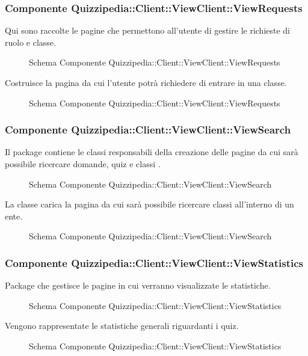 \subsubsection{Componente Quizzipedia::Client::ViewClient::ViewRequests}
Qui sono raccolte le pagine che permettono all'utente di gestire le richieste di ruolo e classe.
\begin{figure}[H]
\centering
\noindent{}
\caption{Schema Componente Quizzipedia::Client::ViewClient::ViewRequests}
\end{figure}
Costruisce la pagina da cui l'utente potrà richiedere di entrare in una classe.
\begin{figure}[H]
\centering
\noindent{}
\caption{Schema Componente Quizzipedia::Client::ViewClient::ViewRequests}
\end{figure}
\subsubsection{Componente Quizzipedia::Client::ViewClient::ViewSearch}
Il package contiene le classi responsabili della creazione delle pagine da cui sarà possibile ricercare domande, quiz e classi .
\begin{figure}[H]
\centering
\noindent{}
\caption{Schema Componente Quizzipedia::Client::ViewClient::ViewSearch}
\end{figure}
La classe carica la pagina da cui sarà possibile ricercare classi all'interno di un ente.
\begin{figure}[H]
\centering
\noindent{}
\caption{Schema Componente Quizzipedia::Client::ViewClient::ViewSearch}
\end{figure}
\subsubsection{Componente Quizzipedia::Client::ViewClient::ViewStatistics}
Package che gestisce le pagine in cui verranno visualizzate le statistiche.
\begin{figure}[H]
\centering
\noindent{}
\caption{Schema Componente Quizzipedia::Client::ViewClient::ViewStatistics}
\end{figure}
Vengono rappresentate le statistiche generali riguardanti i quiz.
\begin{figure}[H]
\centering
\noindent{}
\caption{Schema Componente Quizzipedia::Client::ViewClient::ViewStatistics}
\end{figure}
